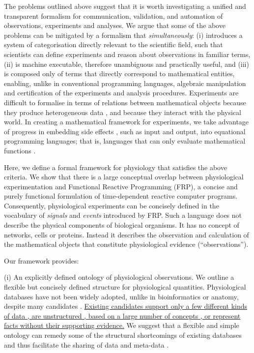 The problems outlined above suggest that it is worth investigating a
unified and transparent formalism for communication, validation, and
automation of observations, experiments and analyses. We argue that
some of the above problems can be mitigated by a formalism that
\emph{simultaneously}: (i) introduces a system of categorisation
directly relevant to the scientific field, such that scientists can
define experiments and reason about observations in familiar terms,
(ii) is machine executable, therefore unambiguous and practically
useful, and (iii) is composed only of terms that directly correspond
to mathematical entities, enabling, unlike in conventional programming
languages, algebraic manipulation and certification of the experiments
and analysis procedures.  Experiments are difficult to formalise in
terms of relations between mathematical objects because they produce
heterogeneous data \cite{Tukey1962}, and because they interact with
the physical world. In creating a mathematical framework for
experiments, we take advantage of progress in embedding side effects
\cite{PeytonJones2002, Roy2004, Wadler1995}, such as input and output,
into equational programming languages; that is, languages that can
only evaluate mathematical functions \cite{Church1941}.

Here, we define a formal framework for physiology
that satisfies the above criteria. We show that there
is a large conceptual overlap between physiological experimentation
and Functional Reactive Programming (FRP\cite{Elliott1997,
  Nilsson2002}), a concise and purely functional formulation of
time-dependent reactive computer programs. Consequently, physiological
experiments can be concisely defined in the vocabulary of
\emph{signals} and \emph{events} introduced by FRP. Such a language
does not describe the physical components of biological organisms. It
has no concept of networks, cells or proteins. Instead it describes
the observation and calculation of the mathematical objects that
constitute physiological evidence (``observations'').

Our framework provides:

(i) An explicitly defined ontology of physiological observations. We
outline a flexible but concisely defined structure for physiological
quantities.  Physiological databases have not been widely
adopted\cite{Herz2008, Amari2002}, unlike in bioinformatics or
anatomy, despite many candidates \cite{Jessop2010, Teeters2008,
  Frishkoff2009, Katz2010}. \underline{Existing candidates support only a
  few different kinds of data , are unstructured
  , based on a large number of concepts
  , or represent facts without their supporting
  evidence.}
We suggest that a flexible and simple ontology can remedy some of the
structural shortcomings\cite{Gardner2005, Amari2002} of existing
databases and thus facilitate the sharing of data and meta-data
\cite{Insel2003}.

